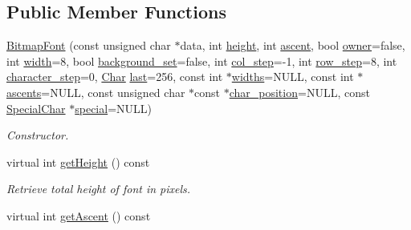 \subsection*{Public Member Functions}
\begin{DoxyCompactItemize}
\item 
\hyperlink{classGUI_1_1BitmapFont_a110d5562ff912779a85c909cc8d41a04}{Bitmap\-Font} (const unsigned char $\ast$data, int \hyperlink{classGUI_1_1BitmapFont_af24866e4d54b86619d792901e2b86f94}{height}, int \hyperlink{classGUI_1_1BitmapFont_a9a80fabdb72d8e9e289109d1fd41dec7}{ascent}, bool \hyperlink{classGUI_1_1BitmapFont_ac50042f33fedf2c8516294780ed6f128}{owner}=false, int \hyperlink{classGUI_1_1BitmapFont_a0b9e1113ed04f7d766aeb961b64ab0c3}{width}=8, bool \hyperlink{classGUI_1_1BitmapFont_acd705cf60d73c04dd028828a7b5c1da3}{background\-\_\-set}=false, int \hyperlink{classGUI_1_1BitmapFont_ac2fab3c605018ebaa18ff59c54f29e1b}{col\-\_\-step}=-\/1, int \hyperlink{classGUI_1_1BitmapFont_aff605105bf7cffd78dfce7dc24f701ac}{row\-\_\-step}=8, int \hyperlink{classGUI_1_1BitmapFont_a27146558fd76b2ac1c2dc7133b23f4ce}{character\-\_\-step}=0, \hyperlink{namespaceGUI_af6b04b46d40197b4f00e553d7d1a3e4c}{Char} \hyperlink{classGUI_1_1BitmapFont_a3c992d29bbd0d35087365a8e5474686c}{last}=256, const int $\ast$\hyperlink{classGUI_1_1BitmapFont_a3b38670c62db18777d86dc9dac7d8b20}{widths}=N\-U\-L\-L, const int $\ast$\hyperlink{classGUI_1_1BitmapFont_ade167bd18d25f17f944c94f9c1333082}{ascents}=N\-U\-L\-L, const unsigned char $\ast$const $\ast$\hyperlink{classGUI_1_1BitmapFont_a95cd04a0232cd076fcb3021e85d0043b}{char\-\_\-position}=N\-U\-L\-L, const \hyperlink{classGUI_1_1Font_af3c234cd3febe27dbe9c76e6cc5cad3a}{Special\-Char} $\ast$\hyperlink{classGUI_1_1BitmapFont_a46f912c496e902dfc614e25261599718}{special}=N\-U\-L\-L)
\begin{DoxyCompactList}\small\item\em Constructor. \end{DoxyCompactList}\item 
\hypertarget{classGUI_1_1BitmapFont_aa6d1d93bb3c19cca85d49e1d10cd2d7d}{virtual int \hyperlink{classGUI_1_1BitmapFont_aa6d1d93bb3c19cca85d49e1d10cd2d7d}{get\-Height} () const }\label{classGUI_1_1BitmapFont_aa6d1d93bb3c19cca85d49e1d10cd2d7d}

\begin{DoxyCompactList}\small\item\em Retrieve total height of font in pixels. \end{DoxyCompactList}\item 
\hypertarget{classGUI_1_1BitmapFont_abc2f11b1e2cedf4494d7d7ab8db81e09}{virtual int \hyperlink{classGUI_1_1BitmapFont_abc2f11b1e2cedf4494d7d7ab8db81e09}{get\-Ascent} () const }\label{classGUI_1_1BitmapFont_abc2f11b1e2cedf4494d7d7ab8db81e09}


\end{DoxyCompactItemize}
